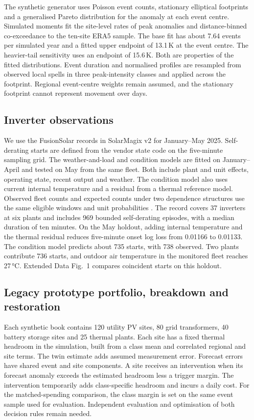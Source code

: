 \documentclass[11pt,a4paper]{article}
\begin{document}
The synthetic generator uses Poisson event counts, stationary elliptical footprints and a generalised Pareto distribution for the anomaly at each event centre. Simulated moments fit the site-level rates of peak anomalies and distance-binned co-exceedance to the ten-site ERA5 sample. The base fit has about 7.64 events per simulated year and a fitted upper endpoint of 13.1\,K at the event centre. The heavier-tail sensitivity uses an endpoint of 15.6\,K. Both are properties of the fitted distributions. Event duration and normalised profiles are resampled from observed local spells in three peak-intensity classes and applied across the footprint. Regional event-centre weights remain assumed, and the stationary footprint cannot represent movement over days.

\subsection*{Inverter observations}

We use the FusionSolar records in SolarMagix v2 for January--May 2025. Self-derating starts are defined from the vendor state code on the five-minute sampling grid. The weather-and-load and condition models are fitted on January--April and tested on May from the same fleet. Both include plant and unit effects, operating state, recent output and weather. The condition model also uses current internal temperature and a residual from a thermal reference model. Observed fleet counts and expected counts under two dependence structures use the same eligible windows and unit probabilities \cite{observed}. The record covers 37 inverters at six plants and includes 969 bounded self-derating episodes, with a median duration of ten minutes. On the May holdout, adding internal temperature and the thermal residual reduces five-minute onset log loss from 0.01166 to 0.01133. The condition model predicts about 735 starts, with 738 observed. Two plants contribute 736 starts, and outdoor air temperature in the monitored fleet reaches 27\,°C. Extended Data Fig.~1 compares coincident starts on this holdout.

\subsection*{Legacy prototype portfolio, breakdown and restoration}

Each synthetic book contains 120 utility PV sites, 80 grid transformers, 40 battery storage sites and 25 thermal plants. Each site has a fixed thermal headroom in the simulation, built from a class mean and correlated regional and site terms. The twin estimate adds assumed measurement error. Forecast errors have shared event and site components. A site receives an intervention when its forecast anomaly exceeds the estimated headroom less a trigger margin. The intervention temporarily adds class-specific headroom and incurs a daily cost. For the matched-spending comparison, the class margin is set on the same event sample used for evaluation. Independent evaluation and optimisation of both decision rules remain needed.
\end{document}
